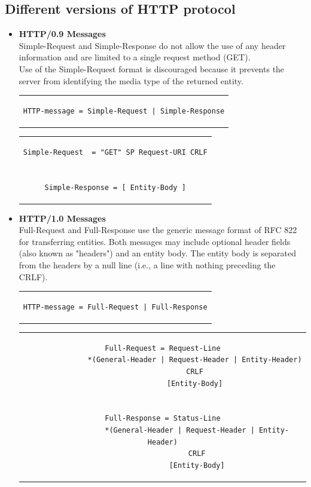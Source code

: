 \subsection{Different versions of HTTP protocol}
\begin{itemize}
\item{\textbf{HTTP/0.9 Messages}\\
Simple-Request and Simple-Response do not allow the use of any header information and are limited to a single request method (GET).\\ Use of the Simple-Request format is discouraged because it prevents the server from identifying the media type of the returned entity.
\begin{center}
\begin{tabular}{c}
\begin{lstlisting}[linewidth=240pt, basicstyle=\footnotesize\sffamily,]
HTTP-message = Simple-Request | Simple-Response
\end{lstlisting}
\end{tabular}
\end{center}
\begin{center}
\begin{tabular}{c}
\begin{lstlisting}[linewidth=230pt, basicstyle=\footnotesize\sffamily,]
Simple-Request  = "GET" SP Request-URI CRLF


Simple-Response = [ Entity-Body ]
\end{lstlisting}
\end{tabular}
\end{center}
}
\item{\textbf{HTTP/1.0 Messages}\\
Full-Request and Full-Response use the generic message format of RFC 822 for transferring entities. Both messages may include optional header fields (also known as "headers") and an entity body. The entity body is separated from the headers by a null line (i.e., a line with nothing preceding the CRLF).
\begin{center}
\begin{tabular}{c}
\begin{lstlisting}[linewidth=230pt, basicstyle=\footnotesize\sffamily,]
HTTP-message = Full-Request | Full-Response
\end{lstlisting}
\end{tabular}
\end{center}
\begin{center}
\begin{tabular}{c}
\begin{lstlisting}[linewidth=340pt, basicstyle=\footnotesize\sffamily,]
Full-Request = Request-Line
               *(General-Header | Request-Header | Entity-Header)
               CRLF
               [Entity-Body]


Full-Response = Status-Line
                *(General-Header | Request-Header | Entity-Header)
                CRLF
                [Entity-Body]
\end{lstlisting}
\end{tabular}
\end{center}
}
\end{itemize}

